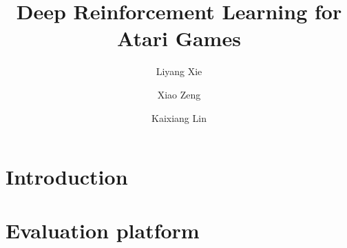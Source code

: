 \documentclass[10pt,twocolumn,letterpaper]{article}
\begin{document}
\title{Deep Reinforcement Learning for Atari Games}

\author{Liyang Xie \and Xiao Zeng \and Kaixiang Lin\\}

\maketitle


\begin{abstract}

\end{abstract}

\section{Introduction}


% 
\section{Evaluation platform}








% 
\end{document}

